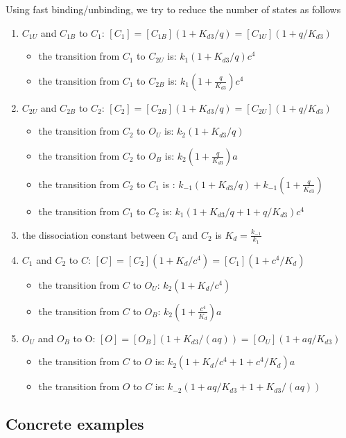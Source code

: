 Using fast binding/unbinding, we try to reduce the number of states as follows
\begin{enumerate}
  \item $C_{1U}$ and $C_{1B}$ to $C_1$:
  $[C_1]=[C_{1B}](1+K_{d3}/q)=[C_{1U}](1+q/K_{d3})$
  \begin{itemize}
    \item the transition from $C_1$ to $C_{2U}$ is: $k_1 (1+K_{d3}/q) c^4$
    \item the transition from $C_1$ to $C_{2B}$ is:
    $k_{1}(1+\frac{q}{K_{d3}})c^4$
  \end{itemize}
  \item $C_{2U}$ and $C_{2B}$ to $C_2$:
  $[C_2]=[C_{2B}](1+K_{d3}/q)=[C_{2U}](1+q/K_{d3})$
  \begin{itemize}
    \item the transition from $C_2$ to $O_{U}$ is: $k_2(1+K_{d3}/q)$
    \item the transition from $C_2$ to $O_{B}$ is: $k_{2}(1+\frac{q}{K_{d3}})a$
    \item the transition from $C_2$ to $C_1$ is :
    $k_{-1}(1+K_{d3}/q)+k_{-1}(1+\frac{q}{K_{d3}})$
    \item the transition from $C_1$ to $C_2$ is: $k_1(1+K_{d3}/q+1+q/K_{d3})c^4$
  \end{itemize}
  \item the dissociation constant between $C_1$ and $C_2$ is $K_d=\frac{k_{-1}}{k_1}$
  \item $C_1$ and $C_2$ to $C$: $[C]=[C_2](1+K_d/c^4)=[C_1](1+c^4/K_d)$
  \begin{itemize}
    \item the transition from $C$ to $O_U$: $k_2(1+K_d/c^4)$
    \item the transition from $C$ to $O_B$: $k_2(1+\frac{c^4}{K_d})a$
  \end{itemize}
  \item $O_U$ and $O_B$ to O: $[O]=[O_B](1+K_{d3}/(aq))=[O_U](1+aq/K_{d3})$
  \begin{itemize}
    \item the transition from $C$ to $O$ is: $k_2(1+K_d/c^4+1+c^4/K_d)a$
    \item the transition from $O$ to $C$ is:
    $k_{-2}(1+aq/K_{d3}+1+K_{d3}/(aq))$
  \end{itemize}
\end{enumerate}



\subsection{Concrete examples}
\label{sec:model_reduction}

